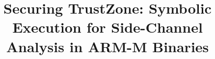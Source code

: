 \documentclass[compsoc, conference, a4paper, 10pt, times]{IEEEtran}
\begin{document}
\title{Securing TrustZone: Symbolic Execution for Side-Channel Analysis in
ARM-M Binaries}


\iffalse
\author{\IEEEauthorblockN{1\textsuperscript{st} Given Names Surname}
\IEEEauthorblockA{\textit{Affiliation} \\
City, Country \\
email address or website URL}
\and
\IEEEauthorblockN{2\textsuperscript{nd} Given Names Surname}
\IEEEauthorblockA{\textit{Affiliation} \\
City, Country \\
email address or website URL}
\and
\IEEEauthorblockN{3\textsuperscript{rd} Given Names Surname}
\IEEEauthorblockA{\textit{Affiliation} \\
City, Country \\
email address or website URL}
}
\fi

\maketitle

\begin{abstract}
\end{abstract}














\end{document}
